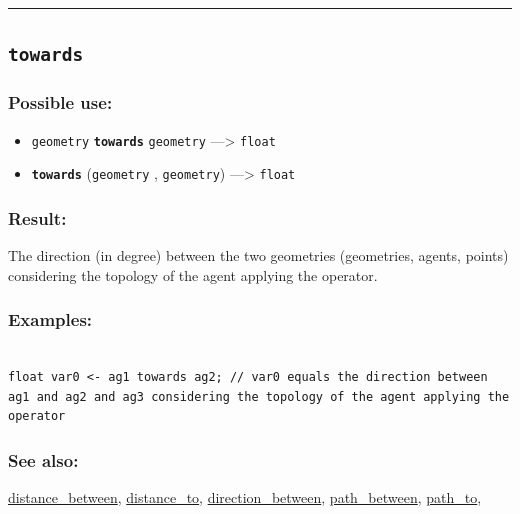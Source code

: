 \documentclass[]{book}
\providecommand{\tightlist}{%
  \setlength{\itemsep}{0pt}\setlength{\parskip}{0pt}}
\theoremstyle{definition}
\theoremstyle{definition}
\theoremstyle{definition}
\theoremstyle{remark}
\begin{document}
\begin{center}\rule{0.5\linewidth}{\linethickness}\end{center}

\subsection{\texorpdfstring{\texttt{towards}}{towards}}\label{towards}

\subsubsection{Possible use:}\label{possible-use-528}

\begin{itemize}
\tightlist
\item
  \texttt{geometry} \textbf{\texttt{towards}} \texttt{geometry}
  ---\textgreater{} \texttt{float}
\item
  \textbf{\texttt{towards}} (\texttt{geometry} , \texttt{geometry})
  ---\textgreater{} \texttt{float}
\end{itemize}

\subsubsection{Result:}\label{result-510}

The direction (in degree) between the two geometries (geometries,
agents, points) considering the topology of the agent applying the
operator.

\subsubsection{Examples:}\label{examples-365}

\begin{verbatim}
 
float var0 <- ag1 towards ag2; // var0 equals the direction between ag1 and ag2 and ag3 considering the topology of the agent applying the operator
\end{verbatim}

\subsubsection{See also:}\label{see-also-208}

\href{operators-d-to-h.html\#distance_between}{distance\_between},
\href{operators-d-to-h.html\#distance_to}{distance\_to},
\href{operators-d-to-h.html\#direction_between}{direction\_between},
\href{operators-n-to-r.html\#path_between}{path\_between},
\href{operators-n-to-r.html\#path_to}{path\_to},
\end{document}
